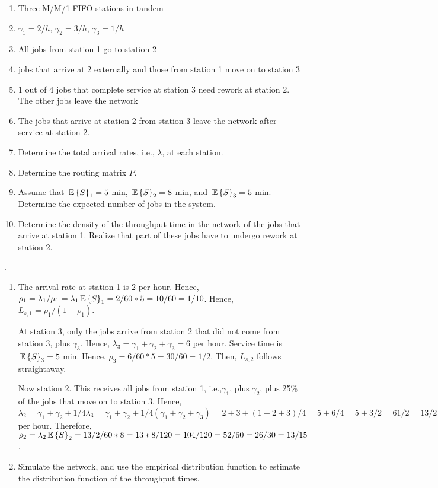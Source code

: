 \begin{question}[use=false]
  \begin{enumerate}
  \item Three M/M/1 FIFO stations in tandem
  \item $\gamma_1 = 2/h$,  $\gamma_2 = 3/h$, $\gamma_3 = 1/h$
  \item All jobs from station 1 go to station 2
  \item jobs that arrive at 2 externally and those from station 1 move
    on to station 3
  \item 1 out of 4 jobs that complete service at station 3 need rework
    at station 2. The other  jobs leave the network
  \item The jobs that arrive at station 2 from station 3 leave the
    network after service at station 2.
  \item Determine the total arrival rates, i.e., $\lambda$, at each
    station. 
  \item Determine the routing matrix $P$. 
  \item Assume that $\,\mathbb{E}\left\{S\right\}_1 = 5$ min, $\,\mathbb{E}\left\{S\right\}_2 = 8$ min, and $\,\mathbb{E}\left\{S\right\}_3 =
    5$ min. Determine the expected number of jobs in the system. 
  \item Determine the density of the throughput time in the network
    of the jobs that arrive at station 1. Realize that part of these
    jobs have to undergo rework at station 2.
  \end{enumerate}
\begin{solution}
\TBD.
  \begin{enumerate}
  \item 
  The arrival rate at station 1 is $2$ per hour. Hence, $\rho_1 =
  \lambda_1/\mu_1 = \lambda_1 \,\mathbb{E}\left\{S\right\}_1 = 2/60 * 5 = 10/60 =
  1/10$. Hence, $L_{s,1} = \rho_1/(1-\rho_1)$.

  At station 3, only the jobs arrive from station 2 that did not come
  from station 3, plus $\gamma_3$. Hence, $\lambda_3 = \gamma_1 +
  \gamma_2 + \gamma_3 = 6$ per hour. Service time is $\,\mathbb{E}\left\{S\right\}_3 = 5$
  min. Hence, $\rho_3 = 6/60 * 5 = 30/60 = 1/2$. Then, $L_{s,2}$
  follows straightaway.

  Now station 2. This receives all jobs from station 1,
  i.e.,$\gamma_1$, plus $\gamma_2$, plus 25\% of the jobs that move on
  to station 3. Hence, $\lambda_2 = \gamma_1 + \gamma_2 + 1/4
  \lambda_3 = \gamma_1 + \gamma_2 + 1/4(\gamma_1 + \gamma_2 +
  \gamma_3) = 2 + 3 + (1+2+3)/4 = 5+6/4 = 5 + 3/2 = 6 1/2 = 13/2$ per
  hour. Therefore, $\rho_2 = \lambda_2 \,\mathbb{E}\left\{S\right\}_2 = 13/2/60 * 8 = 13*8/120
  = 104/120 = 52/60 = 26/30 = 13/15$.
\item   Simulate the network, and use the empirical distribution function to
  estimate the distribution function of the throughput times.
  \end{enumerate}
\end{solution}
\end{question}
